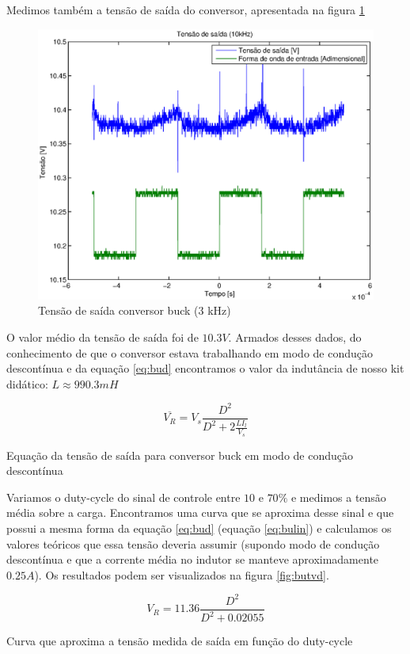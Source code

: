 \documentclass{article}
\begin{document}
Medimos também a tensão de saída do conversor, apresentada na figura \ref{fig:but3k}
\begin{figure}[H]
	\centering
	\includegraphics[width=0.5\linewidth]{Dados/buck/t3k}
	\caption{Tensão de saída conversor buck (3 kHz)}
	\label{fig:but3k}
\end{figure}

O valor médio da tensão de saída foi de $10.3 V$. Armados desses dados, do conhecimento de que o conversor estava trabalhando em modo de condução descontínua e da equação \ref{eq:bud} encontramos o valor da indutância de nosso kit didático: $L \approx  990.3 mH$

\begin{capequ}
	\begin{equation}
	\overline{V_R} = V_s\frac{D^2}{D^2 + 2\frac{LI_l}{V_s}}
	\end{equation}
	\caption{Equação da tensão de saída para conversor buck em modo de condução descontínua}
	\label{eq:bud}
\end{capequ}

Variamos o duty-cycle do sinal de controle entre $10$ e $70\%$ e medimos a tensão média sobre a carga. Encontramos uma curva que se aproxima desse sinal e que possui a mesma forma da equação \ref{eq:bud} (equação \ref{eq:bulin}) e calculamos os valores teóricos que essa tensão deveria assumir (supondo modo de condução descontínua e que a corrente média no indutor se manteve aproximadamente $0.25 A$). Os resultados podem ser visualizados na figura \ref{fig:butvd}.

\begin{capequ}
	\begin{equation}
	V_R = 11.36\frac{D^2}{D^2 +  0.02055}	
	\end{equation}
	\caption{Curva que aproxima a tensão medida de saída em função do duty-cycle}
	\label{eq:bulin}
\end{capequ}
\end{document}
